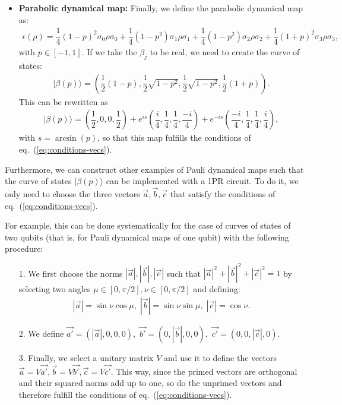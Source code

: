 \documentclass[10pt,letterpaper]{article} %
\newcommand{\eref}[1]{eq.~(\ref{#1})}
\begin{document}
\begin{itemize}
\item \textbf{Parabolic dynamical map:} Finally, we define the parabolic dynamical map as:
\begin{eqnarray}
\epsilon(\rho) = \dfrac{1}{4} (1-p)^2 \sigma_0 \rho \sigma_0 + \dfrac{1}{4} (1-p^2) \sigma_1 \rho \sigma_1 + \dfrac{1}{4} (1-p^2) \sigma_2 \rho \sigma_2 + \dfrac{1}{4} (1+p)^2 \sigma_3 \rho \sigma_3 ,
\end{eqnarray}
with $p \in [-1,1]$. 
If we take the $\beta_j$ to be real,
we need to create the curve of states:
\begin{eqnarray}
|\beta(p)\rangle = \left(\dfrac{1}{2} (1-p) , \dfrac{1}{2} \sqrt{1-p^2} , \dfrac{1}{2} \sqrt{1-p^2} , \dfrac{1}{2}(1+p) \right).
\end{eqnarray}
This can be rewritten as
\begin{align*}
|\beta(p)\rangle = \left( \dfrac{1}{2},0,0, \dfrac{1}{2} \right) + e^{is} \left( \dfrac{i}{4}, \dfrac{1}{4}, \dfrac{1}{4}, \dfrac{-i}{4} \right) + e^{-is}  \left( \dfrac{-i}{4}, \dfrac{1}{4}, \dfrac{1}{4}, \dfrac{i}{4} \right),
\end{align*}
with $s = \arcsin(p)$, so that
this map fulfills the conditions of  \eref{eq:conditions-vecs}.
\end{itemize}

Furthermore, we can construct other examples of 
Pauli dynamical maps
such that the curve of states $|\beta(p)\rangle$ 
can be implemented with a 1PR circuit.
To do it, we only need to choose the three vectors $\vec{a}, \vec{b},\vec{c}$
that satisfy the conditions of  \eref{eq:conditions-vecs}.


For example, this can be done systematically for the case of curves of states of two qubits
(that is, for Pauli dynamical maps of one qubit)
with the following procedure:
\begin{itemize}
\item[1.] We first choose the norms $|\vec{a}|, |\vec{b}|, |\vec{c}|$
such that $|\vec{a}|^2 + |\vec{b}|^2 + |\vec{c}|^2 = 1$
by selecting two angles $\mu \in [0, \pi/2] , \nu \in [0,\pi/2]$ and 
defining:
\begin{align*}
|\vec{a}| = \sin \nu \cos \mu, \; |\vec{b}| = \sin \nu \sin \mu , \; |\vec{c}| = \cos \nu.
\end{align*}
\item[2.] We define $\vec{a'} = (|\vec{a}|,0,0,0),$ $\vec{b'} = (0,|\vec{b}|,0,0),$ $\vec{c'} = (0,0,|\vec{c}|,0)$.
\item[3.] Finally, we select a unitary matrix $V$
and use it to define the vectors $\vec{a} = V \vec{a'}, \vec{b} = V \vec{b'}, \vec{c} = V \vec{c'}$.
This way, since the primed vectors are orthogonal and their squared norms add up to one,
so do the unprimed vectors and therefore 
fulfill the conditions of  \eref{eq:conditions-vecs}. 
\end{itemize}
\end{document}
